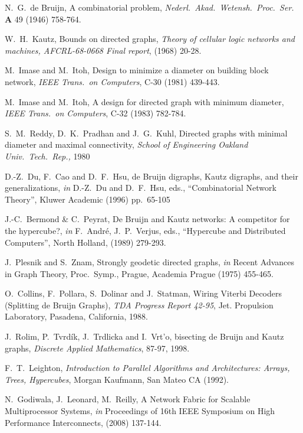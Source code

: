 \documentclass[12pt]{article}
\begin{document}
\begin{thebibliography}{10}


N.\  G.\ de Bruijn, A combinatorial problem,
{\it Nederl.\ Akad.\ Wetensh.\ Proc.\ Ser. } {\bf A}
49 (1946) 758-764.

W.\ H.\ Kautz, Bounds on directed  graphs,
{\it Theory of cellular logic networks and machines, AFCRL-68-0668
Final report}, (1968) 20-28.

M.\ Imase and M.\ Itoh, Design to minimize a diameter on building
block network, {\it IEEE Trans.\ on Computers}, C-30 (1981) 439-443.

M.\ Imase and M.\ Itoh, A design for directed graph with minimum
diameter, {\it IEEE Trans.\ on Computers}, C-32 (1983) 782-784.

S.\ M.\ Reddy, D.\ K.\ Pradhan and J.\ G.\ Kuhl, Directed graphs with
minimal diameter and maximal connectivity,
{\it School of Engineering Oakland Univ.\ Tech.\ Rep.,} 1980
 
D.-Z.\ Du, F.\ Cao and D.\ F.\ Hsu, de Bruijn digraphs, Kautz
digraphs, and their generalizations,
{\it in} D.-Z.\ Du and D.\ F.\ Hsu, eds., ``Combinatorial Network
Theory'', Kluwer Academic (1996) pp.\ 65-105

J.-C.\ Bermond \& C.\  Peyrat, De Bruijn and Kautz networks: A
competitor for the hypercube?, {\it in} F.\ Andr\'e, J.\ P.\ Verjus,
eds., ``Hypercube and Distributed Computers'', North Holland,  (1989) 279-293.

J.\ Plesnik and S.\ Znam, Strongly geodetic directed graphs, {\it in}
Recent Advances in Graph Theory, Proc.\ Symp., Prague, Academia
  Prague (1975) 455-465.

 O.\ Collins, F.\ Pollara, S.\ Dolinar and J.\
Statman, Wiring Viterbi Decoders (Splitting de Bruijn Graphs), 
{\it TDA
Progress Report 42-95}, Jet. Propulsion Laboratory, Pasadena,
California, 1988.

J.\ Rolim, P.\ Tvrd\'ik, J.\ Trdlicka and I.\ Vrt'o, bisecting de
Bruijn and Kautz graphs, 
{\it Discrete Applied Mathematics}, 87-97, 1998.

F.\ T.\ Leighton, {\it Introduction to Parallel Algorithms and
Architectures: Arrays, Trees, Hypercubes}, Morgan Kaufmann, San Mateo
CA (1992).

N.\  Godiwala, J.\  Leonard, M.\  Reilly, A Network Fabric for  
Scalable Multiprocessor Systems, {\it in} Proceedings of
16th IEEE Symposium on High  
Performance Interconnects, (2008) 137-144.



\end{thebibliography}
\end{document}
